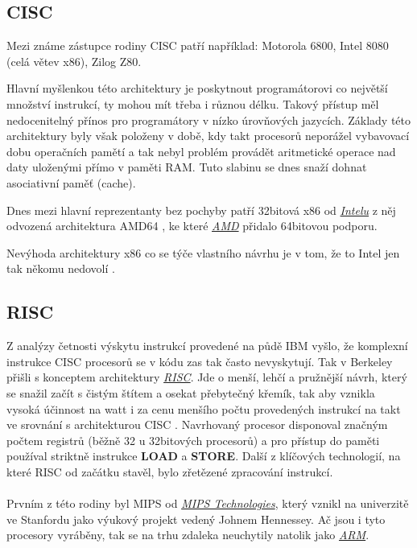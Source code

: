 \documentclass[FM,BP]{tulthesis}
\begin{document}
\subsection{CISC} \label{kap:CISC}

Mezi známe zástupce rodiny CISC patří například: Motorola 6800, Intel 8080 (celá větev x86), Zilog Z80.

Hlavní myšlenkou této architektury je poskytnout programátorovi co největší množství instrukcí, ty mohou mít třeba i různou délku. Takový přístup měl nedocenitelný přínos pro programátory v nízko úrovňových jazycích. 
Základy této architektury byly však položeny v době, kdy takt procesorů neporážel vybavovací dobu operačních pamětí a tak nebyl problém provádět aritmetické operace nad daty uloženými přímo v paměti RAM. Tuto slabinu se dnes snaží dohnat asociativní paměť (cache).

Dnes mezi hlavní reprezentanty bez pochyby patří 32bitová x86 \cite{8086} od \href{https://www.intel.com/content/www/us/en/homepage.html}{\emph{Intelu}} z něj odvozená architektura AMD64 \cite{AMD64}, ke které \href{https://www.amd.com/en}{\emph{AMD}} přidalo 64bitovou podporu.

Nevýhoda architektury x86 co se týče vlastního návrhu je v tom, že to Intel jen tak někomu nedovolí \cite{wiki_X86}.

\subsection{RISC} \label{kap:RISC}
Z analýzy četnosti výskytu instrukcí provedené na půdě IBM vyšlo, že komplexní instrukce CISC procesorů se v kódu zas tak často nevyskytují. Tak v Berkeley přišli s konceptem architektury \href{https://www.sifive.com}{\emph{RISC}}. 
Jde o menší, lehčí a pružnější návrh, který se snažil začít s čistým štítem a osekat přebytečný křemík, tak aby vznikla vysoká účinnost na watt i za cenu menšího počtu provedených instrukcí na takt ve srovnání s architekturou CISC \cite{wiki_RISC}. Navrhovaný procesor disponoval značným počtem registrů (běžně 32 u 32bitových procesorů) a pro přístup do paměti používal striktně instrukce \textbf{LOAD} a \textbf{STORE}. Další z klíčových technologií, na které RISC od začátku stavěl, bylo zřetězené zpracování instrukcí. 

\paragraph{}
Prvním z této rodiny byl MIPS od \href{https://www.mips.com/}{\emph{MIPS Technologies}}, který vznikl na univerzitě ve Stanfordu \cite{Mips} jako výukový projekt vedený Johnem Hennessey. Ač jsou i tyto procesory vyráběny, tak se na trhu zdaleka neuchytily natolik jako \href{https://www.arm.com}{\emph{ARM}}. 
\end{document}
